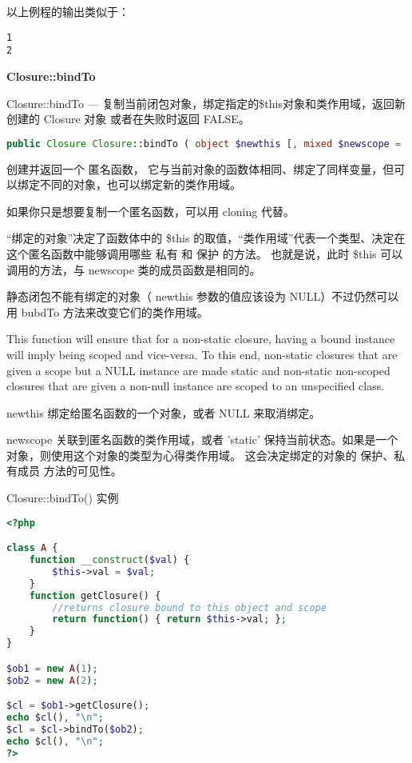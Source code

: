 以上例程的输出类似于：

\begin{verbatim}
1
2
\end{verbatim}

\textbf{Closure::bindTo}

Closure::bindTo — 复制当前闭包对象，绑定指定的\$this对象和类作用域，返回新创建的 Closure 对象 或者在失败时返回 FALSE。

\begin{lstlisting}[language=PHP]
public Closure Closure::bindTo ( object $newthis [, mixed $newscope = 'static' ] )
\end{lstlisting}

创建并返回一个 匿名函数， 它与当前对象的函数体相同、绑定了同样变量，但可以绑定不同的对象，也可以绑定新的类作用域。

如果你只是想要复制一个匿名函数，可以用 cloning 代替。

“绑定的对象”决定了函数体中的 \$this 的取值，“类作用域”代表一个类型、决定在这个匿名函数中能够调用哪些 私有 和 保护 的方法。 也就是说，此时 \$this 可以调用的方法，与 newscope 类的成员函数是相同的。

静态闭包不能有绑定的对象（ newthis 参数的值应该设为 NULL）不过仍然可以用 bubdTo 方法来改变它们的类作用域。

This function will ensure that for a non-static closure, having a bound instance will imply being scoped and vice-versa. To this end, non-static closures that are given a scope but a NULL instance are made static and non-static non-scoped closures that are given a non-null instance are scoped to an unspecified class.

\begin{compactitem}
\item newthis
绑定给匿名函数的一个对象，或者 NULL 来取消绑定。
\item newscope
关联到匿名函数的类作用域，或者 'static' 保持当前状态。如果是一个对象，则使用这个对象的类型为心得类作用域。 这会决定绑定的对象的 保护、私有成员 方法的可见性。
\end{compactitem}


\begin{example}
Closure::bindTo() 实例
\begin{lstlisting}[language=PHP]
<?php

class A {
    function __construct($val) {
        $this->val = $val;
    }
    function getClosure() {
        //returns closure bound to this object and scope
        return function() { return $this->val; };
    }
}

$ob1 = new A(1);
$ob2 = new A(2);

$cl = $ob1->getClosure();
echo $cl(), "\n";
$cl = $cl->bindTo($ob2);
echo $cl(), "\n";
?>
\end{lstlisting}
\end{example}

